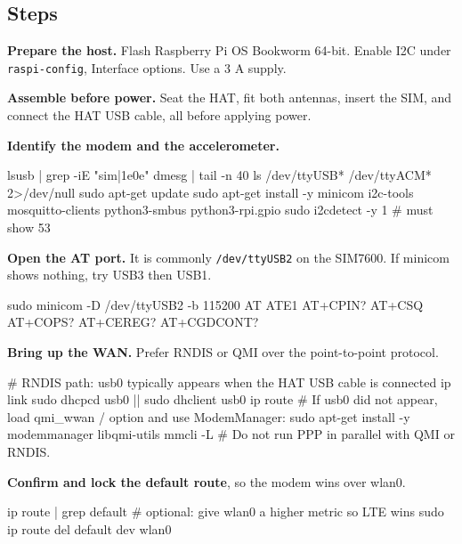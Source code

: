\subsection*{Steps}

\begin{steps}
\item \textbf{Prepare the host.} Flash Raspberry Pi OS Bookworm 64-bit. Enable I2C under \texttt{raspi-config}, Interface options. Use a 3 A supply.

\item \textbf{Assemble before power.} Seat the HAT, fit both antennas, insert the SIM, and connect the HAT USB cable, all before applying power.

\item \textbf{Identify the modem and the accelerometer.}
\begin{shellcode}
lsusb | grep -iE "sim|1e0e"
dmesg | tail -n 40
ls /dev/ttyUSB* /dev/ttyACM* 2>/dev/null
sudo apt-get update
sudo apt-get install -y minicom i2c-tools mosquitto-clients python3-smbus python3-rpi.gpio
sudo i2cdetect -y 1          # must show 53
\end{shellcode}

\item \textbf{Open the AT port.} It is commonly \texttt{/dev/ttyUSB2} on the SIM7600. If minicom shows nothing, try USB3 then USB1.
\begin{atcode}
sudo minicom -D /dev/ttyUSB2 -b 115200
AT
ATE1
AT+CPIN?
AT+CSQ
AT+COPS?
AT+CEREG?
AT+CGDCONT?
\end{atcode}

\item \textbf{Bring up the WAN.} Prefer RNDIS or QMI over the point-to-point protocol.
\begin{shellcode}
# RNDIS path: usb0 typically appears when the HAT USB cable is connected
ip link
sudo dhcpcd usb0 || sudo dhclient usb0
ip route
# If usb0 did not appear, load qmi_wwan / option and use ModemManager:
sudo apt-get install -y modemmanager libqmi-utils
mmcli -L
# Do not run PPP in parallel with QMI or RNDIS.
\end{shellcode}

\item \textbf{Confirm and lock the default route}, so the modem wins over wlan0.
\begin{shellcode}
ip route | grep default
# optional: give wlan0 a higher metric so LTE wins
sudo ip route del default dev wlan0
\end{shellcode}


\end{steps}
